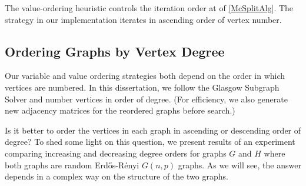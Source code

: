 The value-ordering heuristic controls the iteration
order at  of \cref{McSplitAlg}. The strategy
in our implementation iterates in ascending order of vertex number.

\subsection{Ordering Graphs by Vertex Degree}

Our variable and value ordering strategies both depend on the order
in which vertices are numbered.
In this dissertation, we follow the Glasgow Subgraph Solver
\citep{DBLP:journals/jair/McCreeshPST18,DBLP:conf/gg/McCreeshP020}
and number vertices in order of degree. (For efficiency, we
also generate new adjacency matrices for the reordered graphs
before search.)

Is it better to order the vertices in each graph in ascending or descending
order of degree?  To shed some light on this question, we present results of an
experiment comparing increasing and decreasing degree orders for graphs
$G$ and $H$ where both graphs are random Erd\H{o}s-Rényi $G(n,p)$ graphs.  As
we will see, the answer depends in a complex way on the structure of the two
graphs.

